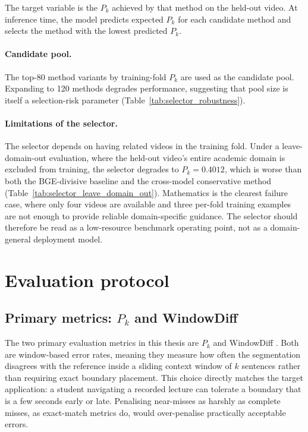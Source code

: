 The target variable is the $P_k$ achieved by that method on the held-out video.
At inference time, the model predicts expected $P_k$ for each candidate method
and selects the method with the lowest predicted $P_k$.

\paragraph{Candidate pool.}
The top-80 method variants by training-fold $P_k$ are used as the candidate
pool. Expanding to 120 methods degrades performance, suggesting that pool
size is itself a selection-risk parameter (Table~\ref{tab:selector_robustness}).

\paragraph{Limitations of the selector.}
The selector depends on having related videos in the training fold.
Under a leave-domain-out evaluation, where the held-out video's entire academic
domain is excluded from training, the selector degrades to
$P_k = 0.4012$, which is worse than both the BGE-divisive baseline and the
cross-model conservative method (Table~\ref{tab:selector_leave_domain_out}).
Mathematics is the clearest failure case, where only four videos are available
and three per-fold training examples are not enough to provide reliable
domain-specific guidance.
The selector should therefore be read as a low-resource benchmark
operating point, not as a domain-general deployment model.

\section{Evaluation protocol}
\label{sec:eval}

\subsection{Primary metrics: $P_k$ and WindowDiff}

The two primary evaluation metrics in this thesis are $P_k$
\cite{beeferman1999statistical} and WindowDiff \cite{pevzner2002critique}.
Both are window-based error rates, meaning they measure how often the
segmentation disagrees with the reference inside a sliding context window of
$k$ sentences rather than requiring exact boundary placement.
This choice directly matches the target application: a student navigating
a recorded lecture can tolerate a boundary that is a few seconds early or late.
Penalising near-misses as harshly as complete misses, as exact-match metrics
do, would over-penalise practically acceptable errors.

